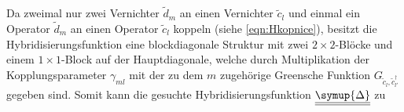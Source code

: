 Da zweimal nur zwei Vernichter $\tilde{d}_m$ an einen Vernichter $\tilde{c}_l$ und einmal ein Operator $\tilde{d}_m$ an einen Operator $\tilde{c}_l$ koppeln
(siehe \eqref{eqn:Hkopnice}), 
besitzt die Hybridisierungsfunktion
eine blockdiagonale Struktur mit zwei $2 \times 2$-Blöcke und einem $1 \times 1$-Block auf der Hauptdiagonale, welche 
durch Multiplikation der Kopplungsparameter $\gamma_{ml}$ mit der zu dem $m$ zugehörige Greensche Funktion $G_{\tilde{c}_l, \tilde{c}^\dagger_{l'}}$ gegeben sind.
Somit kann die gesuchte Hybridisierungsfunktion $\underline{\underline{\symup{\Delta}}}$ zu
